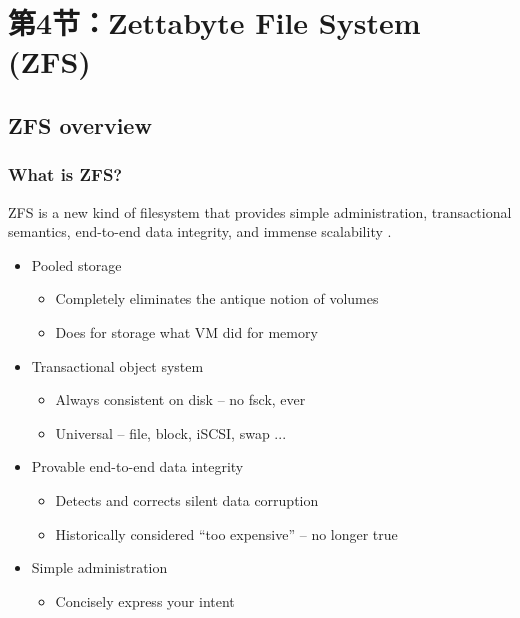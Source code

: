 \section{第4节：Zettabyte File System (ZFS)} %
\subsection{ZFS overview} %
\begin{frame}[fragile]
    \frametitle{What is ZFS?}
    ZFS is a new kind of filesystem that provides simple administration, transactional semantics, end-to-end data integrity, and immense scalability .
    \pause

    \begin{itemize}
        \item Pooled storage
        \begin{itemize}
            \item Completely eliminates the antique notion of volumes
            \item Does for storage what VM did for memory
        \end{itemize} \pause
        \item Transactional object system
        \begin{itemize}
            \item Always consistent on disk – no fsck, ever
            \item Universal – file, block, iSCSI, swap ...
        \end{itemize} \pause
        \item Provable end-to-end data integrity
        \begin{itemize}
            \item Detects and corrects silent data corruption
            \item Historically considered “too expensive” – no longer true
        \end{itemize} \pause
        \item Simple administration
        \begin{itemize}
            \item Concisely express your intent
        \end{itemize}
    \end{itemize}
\end{frame}
